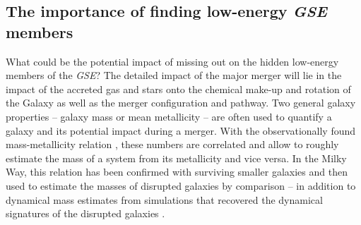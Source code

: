 \documentclass[fleqn,usenatbib]{mnras}
\begin{document}
\subsection{The importance of finding low-energy \textit{GSE} members} \label{sec:discussion_strategy_finding_gse_members}

What could be the potential impact of missing out on the hidden low-energy members of the \textit{GSE}? The detailed impact of the major merger will lie in the impact of the accreted gas and stars onto the chemical make-up and rotation of the Galaxy as well as the merger configuration and pathway. Two general galaxy properties -- galaxy mass or mean metallicity -- are often used to quantify a galaxy and its potential impact during a merger. With the observationally found mass-metallicity relation \citep[for example][]{Gallazzi2005, Kirby2013}, these numbers are correlated and allow to roughly estimate the mass of a system from its metallicity and vice versa. In the Milky Way, this relation has been confirmed with surviving smaller galaxies \citep{Kirby2013} and then used to estimate the masses of disrupted galaxies by comparison \citep[for example][]{Helmi2018} -- in addition to dynamical mass estimates from simulations that recovered the dynamical signatures of the disrupted galaxies \citep[for example][]{Naidu2022b}.
\end{document}
